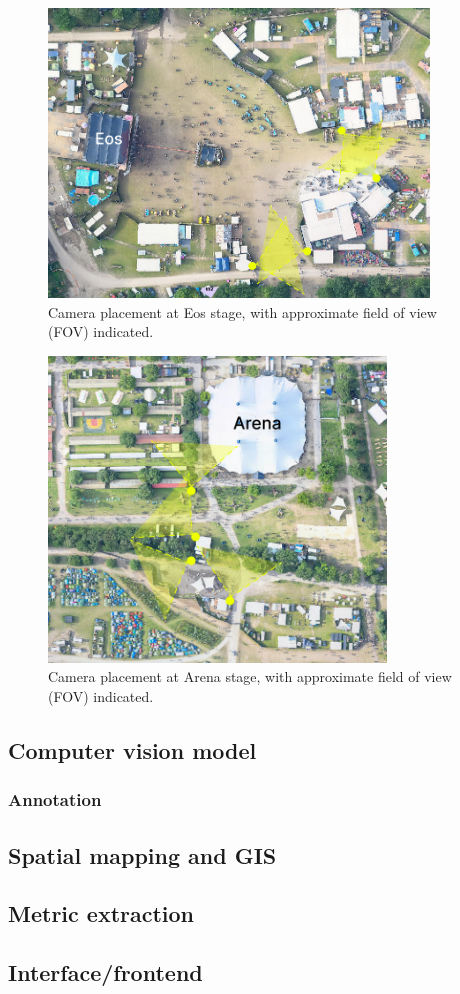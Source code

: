 \begin{figure}[H]
  \centering
  \includegraphics[width=0.9\textwidth]{Pictures/Figures/eos_cameras.png}
  \caption{Camera placement at Eos stage, with approximate field of view (FOV) indicated.}
  \label{fig:eos_cameras}
\end{figure}

\begin{figure}[H]
  \centering
  \includegraphics[width=0.8\textwidth]{Pictures/Figures/arena_cameras.png}
  \caption{Camera placement at Arena stage, with approximate field of view (FOV) indicated.}
  \label{fig:arena_cameras}
\end{figure}




\subsection{Computer vision model}

\subsubsection{Annotation}

\subsection{Spatial mapping and GIS}

\subsection{Metric extraction}

\subsection{Interface/frontend}
